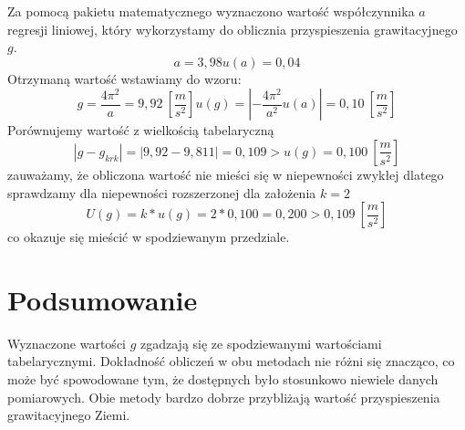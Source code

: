 \documentclass[a4paper,10pt,twoside]{article}
\begin{document}
Za pomocą pakietu matematycznego wyznaczono wartość współczynnika $a$ regresji liniowej, który wykorzystamy do oblicznia
przyspieszenia grawitacyjnego $g$.
\begin{subequations}
\begin{equation}
a = 3,98
\end{equation}
\begin{equation}
u(a) = 0,04
\end{equation}
\end{subequations}
Otrzymaną wartość wstawiamy do wzoru:
\begin{subequations}
\begin{equation}
g = \frac{4\pi^2}{a} = 9,92~\left[\frac{m}{s^2}\right]
\end{equation}
\begin{equation}
u(g) = \left|-\frac{4\pi^2}{a^2}u(a)\right| = 0,10~\left[\frac{m}{s^2}\right]
\end{equation}
\end{subequations}
Porównujemy wartość z wielkością tabelaryczną
\begin{equation}
\left| g-g_{krk} \right| = \left| 9,92-9,811 \right| = 0,109 > u(g) = 0,100~\left[\frac{m}{s^2}\right]
\end{equation}
zauważamy, że obliczona wartość nie mieści się w niepewności zwykłej dlatego sprawdzamy dla niepewności rozszerzonej dla założenia $k=2$
\begin{equation}
U(g)=k*u(g)=2*0,100=0,200>0,109~\left[\frac{m}{s^2}\right]
\end{equation}
co okazuje się mieścić w spodziewanym przedziale.
\section{Podsumowanie}
Wyznaczone wartości $g$ zgadzają się ze spodziewanymi wartościami tabelarycznymi. Dokładność obliczeń w obu metodach nie różni
się znacząco, co może być spowodowane tym, że dostępnych było stosunkowo niewiele danych pomiarowych. Obie metody bardzo dobrze
przybliżają wartość przyspieszenia grawitacyjnego Ziemi.
\end{document}
